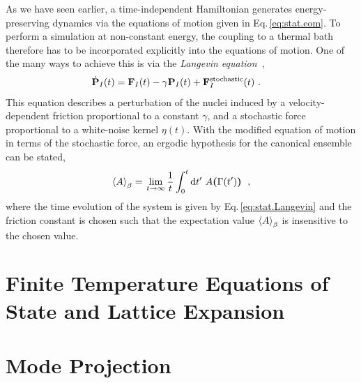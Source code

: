 As we have seen earlier, a time-independent Hamiltonian generates energy-preserving dynamics via the equations of motion given in Eq.\,\eqref{eq:stat.eom}. To perform a simulation at non-constant energy, the coupling to a thermal bath therefore has to be incorporated explicitly into the equations of motion. One of the many ways to achieve this is via the \emph{Langevin equation}~\cite{Vanden2006},
\begin{align}
	\dot{\b P}_I (t) 
		&= \b F_I (t) - \gamma \b P_I (t) + \b F^{\rm stochastic}_I (t)~.
	\label{eq:stat.Langevin}
\end{align}
This equation describes a perturbation of the nuclei induced by a velocity-dependent friction proportional to a constant $\gamma$,%
and a stochastic force proportional to a white-noise kernel $\eta (t)$. With the modified equation of motion in terms of the stochastic force, an ergodic hypothesis for the canonical ensemble can be stated,
% 
\begin{align}
	\braket{A}_\beta
		= \left. \lim\limits_{t \to \infty} \frac{1}{t} \int_0^t \d t' ~ A {\bm (} \Gamma(t') {\bm )}
			\right.~,
	\label{eq:time.average.canonical}
\end{align}
where the time evolution of the system is given by Eq.\,\eqref{eq:stat.Langevin} and the friction constant is chosen such that the expectation value $\braket{A}_\beta$ is insensitive to the chosen value.

 \cite[p.\,590]{Tuckerman}

\section{Finite Temperature Equations of State and Lattice Expansion}



\section{Mode Projection}
